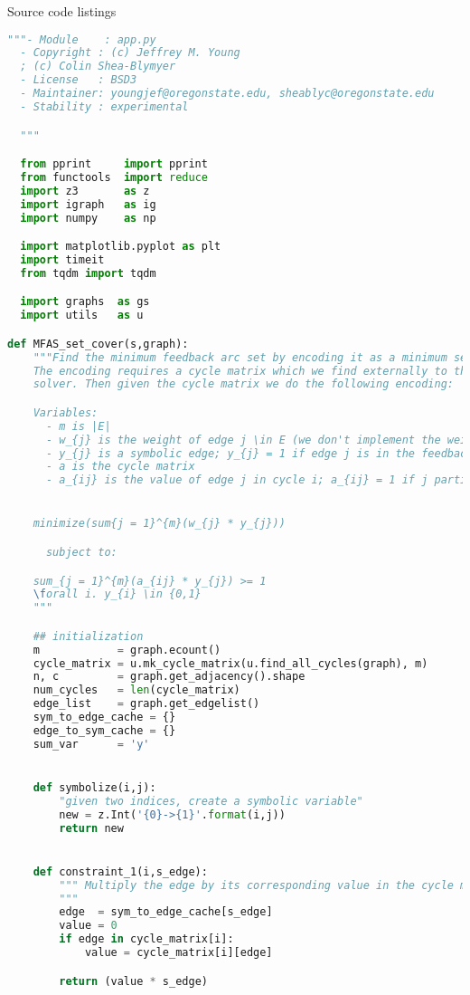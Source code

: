 Source code listings

\begin{lstlisting}[language=python]
  """- Module    : app.py
  - Copyright : (c) Jeffrey M. Young
  ; (c) Colin Shea-Blymyer
  - License   : BSD3
  - Maintainer: youngjef@oregonstate.edu, sheablyc@oregonstate.edu
  - Stability : experimental

  """

  from pprint     import pprint
  from functools  import reduce
  import z3       as z
  import igraph   as ig
  import numpy    as np

  import matplotlib.pyplot as plt
  import timeit
  from tqdm import tqdm

  import graphs  as gs
  import utils   as u

def MFAS_set_cover(s,graph):
    """Find the minimum feedback arc set by encoding it as a minimum set cover.
    The encoding requires a cycle matrix which we find externally to the SAT
    solver. Then given the cycle matrix we do the following encoding:

    Variables:
      - m is |E|
      - w_{j} is the weight of edge j \in E (we don't implement the weight matrix)
      - y_{j} is a symbolic edge; y_{j} = 1 if edge j is in the feedback edge set and 0 otherwise
      - a is the cycle matrix
      - a_{ij} is the value of edge j in cycle i; a_{ij} = 1 if j participates, 0 otherwise


    minimize(sum{j = 1}^{m}(w_{j} * y_{j}))

      subject to:

    sum_{j = 1}^{m}(a_{ij} * y_{j}) >= 1
    \forall i. y_{i} \in {0,1}
    """

    ## initialization
    m            = graph.ecount()
    cycle_matrix = u.mk_cycle_matrix(u.find_all_cycles(graph), m)
    n, c         = graph.get_adjacency().shape
    num_cycles   = len(cycle_matrix)
    edge_list    = graph.get_edgelist()
    sym_to_edge_cache = {}
    edge_to_sym_cache = {}
    sum_var      = 'y'


    def symbolize(i,j):
        "given two indices, create a symbolic variable"
        new = z.Int('{0}->{1}'.format(i,j))
        return new


    def constraint_1(i,s_edge):
        """ Multiply the edge by its corresponding value in the cycle matrix
        """
        edge  = sym_to_edge_cache[s_edge]
        value = 0
        if edge in cycle_matrix[i]:
            value = cycle_matrix[i][edge]

        return (value * s_edge)



\end{lstlisting}

